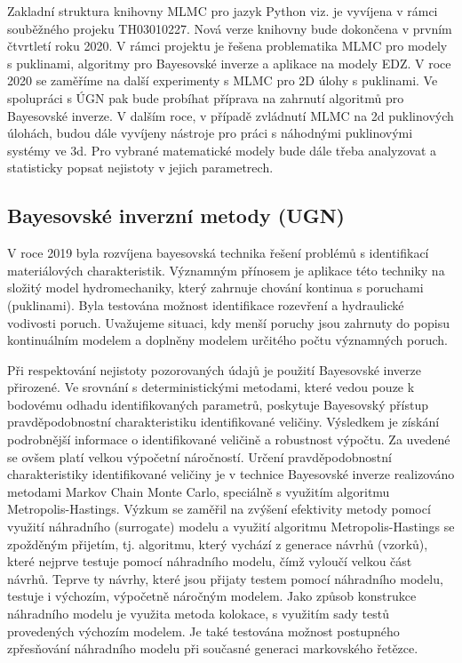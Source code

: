 \documentclass[11pt,a4paper]{article}
\begin{document}
\begin{onehalfspacing}
Zakladní struktura knihovny MLMC pro jazyk Python viz. \cite{mlmclib} je vyvíjena v rámci souběžného projeku  TH03010227. Nová verze knihovny bude dokončena 
v prvním čtvrtletí roku 2020. V rámci projektu  je řešena problematika
MLMC pro modely s puklinami, algoritmy pro Bayesovské inverze a aplikace na modely EDZ.
V roce 2020 se zaměříme na další experimenty s MLMC pro 2D úlohy s puklinami. Ve spolupráci s ÚGN pak bude probíhat příprava na zahrnutí algoritmů pro Bayesovské inverze. V dalším roce, v případě zvládnutí MLMC na 2d puklinových úlohách, budou dále vyvíjeny nástroje pro práci s náhodnými puklinovými systémy ve 3d.
Pro vybrané matematické modely bude dále třeba analyzovat a statisticky popsat nejistoty v jejich parametrech. 


\subsection{Bayesovské inverzní metody (UGN)}
V roce 2019 byla rozvíjena bayesovská technika řešení problémů s identifikací materiálových charakteristik. Významným přínosem je aplikace této techniky na složitý model hydromechaniky, který zahrnuje chování kontinua s poruchami (puklinami). Byla testována možnost identifikace rozevření a hydraulické vodivosti poruch. Uvažujeme situaci, kdy menší poruchy jsou zahrnuty do popisu kontinuálním modelem a doplněny modelem určitého počtu významných poruch.

Při respektování nejistoty pozorovaných údajů je použití Bayesovské inverze přirozené. Ve srovnání s deterministickými metodami, které vedou pouze k bodovému odhadu identifikovaných parametrů, poskytuje Bayesovský přístup pravděpodobnostní charakteristiku identifikované veličiny. Výsledkem je získání podrobnější informace o identifikované veličině a robustnost výpočtu. Za uvedené se ovšem platí velkou výpočetní náročností.
Určení pravděpodobnostní charakteristiky identifikované veličiny je v technice Bayesovské inverze realizováno metodami Markov Chain Monte Carlo, speciálně s využitím algoritmu Metropolis-Hastings. Výzkum se zaměřil na zvýšení efektivity metody pomocí využití náhradního (surrogate) modelu a využití algoritmu Metropolis-Hastings se zpožděným přijetím, tj. algoritmu, který vychází z generace návrhů (vzorků), které nejprve testuje pomocí náhradního modelu, čímž vyloučí velkou část návrhů. Teprve ty návrhy, které jsou přijaty testem pomocí náhradního modelu, testuje i výchozím, výpočetně náročným modelem.
Jako způsob konstrukce náhradního modelu je využita metoda kolokace, s využitím sady testů provedených výchozím modelem. Je také testována možnost postupného zpřesňování náhradního modelu při současné generaci markovského řetězce.


\end{onehalfspacing}
\end{document}
